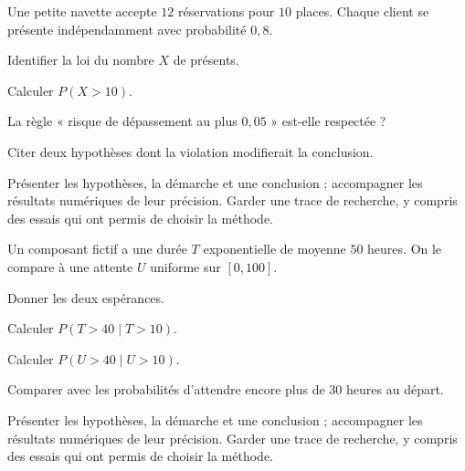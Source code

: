 \label{projet-7}
Une petite navette accepte $12$ réservations pour $10$ places. Chaque client se présente indépendamment avec probabilité $0{,}8$.
\begin{questions}
\item Identifier la loi du nombre $X$ de présents.
\item Calculer $P(X>10)$.
\item La règle « risque de dépassement au plus $0{,}05$ » est-elle respectée ?
\item Citer deux hypothèses dont la violation modifierait la conclusion.
\end{questions}
\vspace{5mm}\noindent Présenter les hypothèses, la démarche et une conclusion ; accompagner les résultats numériques de leur précision. Garder une trace de recherche, y compris des essais qui ont permis de choisir la méthode.\par\vfill{}\par\vspace{2mm}\noindent{}
\label{projet-8}
Un composant fictif a une durée $T$ exponentielle de moyenne $50$ heures. On le compare à une attente $U$ uniforme sur $[0,100]$.
\begin{questions}
\item Donner les deux espérances.
\item Calculer $P(T>40\mid T>10)$.
\item Calculer $P(U>40\mid U>10)$.
\item Comparer avec les probabilités d’attendre encore plus de $30$ heures au départ.
\end{questions}
\vspace{5mm}\noindent Présenter les hypothèses, la démarche et une conclusion ; accompagner les résultats numériques de leur précision. Garder une trace de recherche, y compris des essais qui ont permis de choisir la méthode.\par\vfill{}\par\vspace{2mm}\noindent{}
